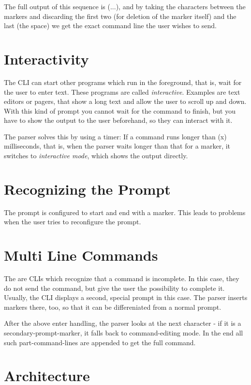 \documentclass[paper=a4,abstract=on,cleardoublepage=empty,numbers=noenddot,toc=bib]{scrreprt}
\begin{document}
The full output of this sequence is (...), and by taking the characters between the markers and discarding the first two (for deletion of the marker itself) and the last (the space) we get the exact command line the user wishes to send.

\section{Interactivity}

The \textsc{CLI} can start other programs which run in the foreground, that is, wait for the user to enter text. These programs are called \emph{interactive}. Examples are text editors or pagers, that show a long text and allow the user to scroll up and down. With this kind of prompt you cannot wait for the command to finish, but you have to show the output to the user beforehand, so they can interact with it.

The parser solves this by using a timer: If a command runs longer than (x) milliseconds, that is, when the parser waits longer than that for a marker, it switches to \emph{interactive mode}, which shows the output directly.

\section{Recognizing the Prompt}

The prompt is configured to start and end with a marker. This leads to problems when the user tries to reconfigure the prompt.

\section{Multi Line Commands}

The are \textsc{CLI}s which recognize that a command is incomplete. In this case, they do not send the command, but give the user the possibility to complete it. Usually, the CLI displays a second, special prompt in this case. The parser inserts markers there, too, so that it can be differeniated from a normal prompt.

After the above enter handling, the parser looks at the next character - if it is a secondary-prompt-marker, it falls back to command-editing mode. In the end all such part-command-lines are appended to get the full command.

\section{Architecture}
\end{document}
